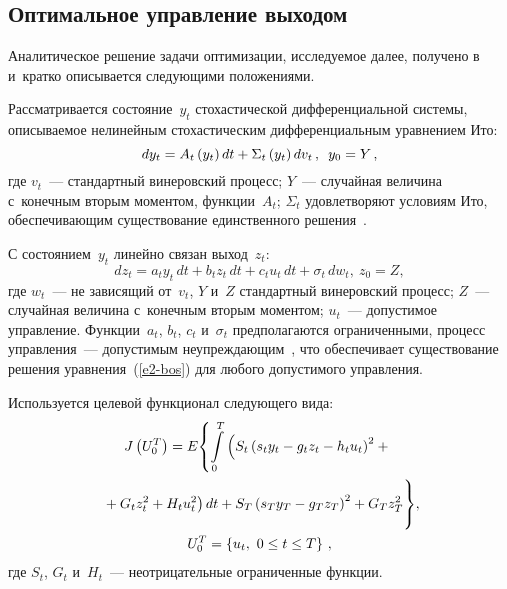 \begin{multicols}{2}
\section{Оптимальное управление выходом}

     Аналитическое решение задачи оптимизации, исследуемое далее, 
получено в~\cite{1-bos} и~кратко описывается следующими положениями. 

Рассматривается состояние~$y_t$ стохастической дифференциальной 
системы, описываемое нелинейным стохастическим дифференциальным 
уравнением Ито:
     \begin{equation}
     dy_t=A_t\left( y_t\right) dt+\Sigma_t\left( y_t\right) dv_t\,,\enskip y_0=Y\,,
     \label{e1-bos}
     \end{equation}
где $v_t$~--- стандартный винеровский процесс; 
$Y$~--- случайная величина с~конечным вторым моментом, функции~$A_t$;
$\Sigma_t$ удовлетворяют 
условиям Ито, обес\-пе\-чи\-ва\-ющим существование единственного 
решения~\cite{10-bos}.

     С состоянием~$y_t$ линейно связан выход~$z_t$:
     \begin{equation}
     dz_t=a_ty_t\,dt+b_tz_t\,dt+c_tu_t\,dt+\sigma_t\,dw_t,\ z_0=Z,
     \label{e2-bos}
     \end{equation}
где $w_t$~--- не зависящий от~$v_t$, $Y$ и~$Z$ стандартный винеровский 
процесс; $Z$~--- случайная величина с~конечным вторым моментом;  
$u_t$~--- допустимое управление. Функции~$a_t$, $b_t$, $c_t$ и~$\sigma_t$ 
предполагаются ограниченными, процесс управления~--- допустимым 
неупреждающим~\cite{10-bos}, что обеспечивает существование решения 
уравнения~(\ref{e2-bos}) для любого допустимого управления.
     
     Используется целевой функционал следующего вида:
     \begin{multline}
     J\left( U_0^T\right) =E\!\left\{ 
     \int\limits_0^T \left( S_t \left( s_ty_t-g_tz_t-
h_tu_t\right)^2+{}\right.\right.\\
\left.\left.{}+G_tz_t^2+H_tu_t^2\right)dt+ 
S_T\left( s_T y_T -g_T z_T\right)^2+G_Tz_T^2
     \vphantom{\int\limits_0^T}
     \right\}\!,\\
     U_0^T=\left\{ u_t,\ 0\leq t\leq T\right\}\,,
     \label{e3-bos}
     \end{multline}
где $S_t$, $G_t$ и~$H_t$~--- неотрицательные ограниченные функции.   
     

\end{multicols}
